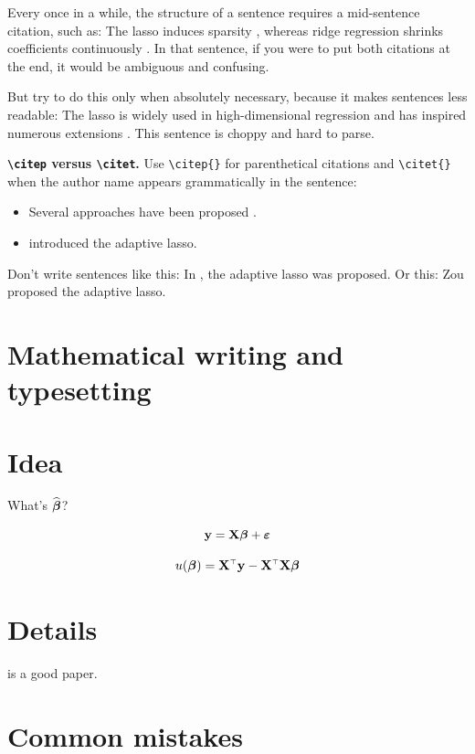 Every once in a while, the structure of a sentence requires a mid-sentence citation, such as: The lasso induces sparsity \citep{Tibshirani1996}, whereas ridge regression shrinks coefficients continuously \citep{Hoerl1970}. In that sentence, if you were to put both citations at the end, it would be ambiguous and confusing.

But try to do this only when absolutely necessary, because it makes sentences less readable: The lasso \citep{Tibshirani1996} is widely used in high-dimensional regression \citep{Hastie2009} and has inspired numerous extensions \citep{Zou2005,Fan2001}. This sentence is choppy and hard to parse.

\textbf{\texttt{\textbackslash citep} versus \texttt{\textbackslash citet}.} Use \verb|\citep{}| for parenthetical citations and \verb|\citet{}| when the author name appears grammatically in the sentence:

\begin{itemize}
\item Several approaches have been proposed \citep{Fan2001, Zou2005}.
\item \citet{Zou2005} introduced the adaptive lasso.
\end{itemize}

Don't write sentences like this: In \citep{Zou2005}, the adaptive lasso was proposed. Or this: Zou \citep{Zou2005} proposed the adaptive lasso.

\section{Mathematical writing and typesetting}

\section{Idea}

What's $\widehat{\boldsymbol{\beta}}$?

$$ \mathbf{y} = \mathbf{X}\boldsymbol{\beta} + \boldsymbol{\varepsilon} $$

\begin{equation}
  \label{eq:score-function}
  u(\boldsymbol{\beta}) = \mathbf{X} ^{\scriptscriptstyle\top} \mathbf{y} - \mathbf{X} ^{\scriptscriptstyle\top} \mathbf{X} \boldsymbol{\beta}
\end{equation}

\section{Details}

\citet{Tibshirani1996} is a good paper.

\section{Common mistakes}

